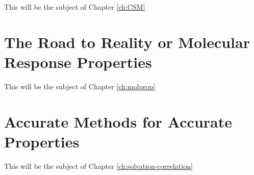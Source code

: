 \autocite{Anderson1972-ai}

This will be the subject of Chapter \ref{ch:CSM}

\section*{The Road to Reality or Molecular Response Properties}

This will be the subject of Chapter \ref{ch:molprop}

\section*{Accurate Methods for Accurate Properties}

This will be the subject of Chapter \ref{ch:solvation-correlation}
